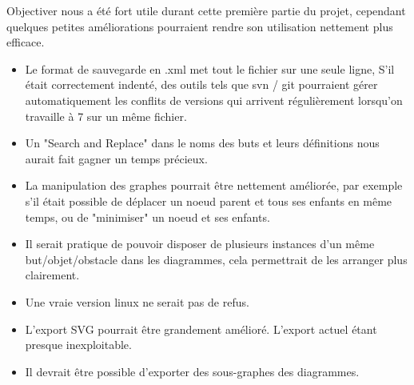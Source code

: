 Objectiver nous a été fort utile durant cette première partie du projet,
cependant quelques petites améliorations pourraient rendre son utilisation
nettement plus efficace.

\begin{itemize}
	\item Le format de sauvegarde en .xml met tout le fichier sur une seule
	ligne, S'il était correctement indenté, des outils tels que svn / git
	pourraient gérer automatiquement les conflits de versions qui arrivent
	régulièrement lorsqu'on travaille à 7 sur un même fichier.
	
	\item Un "Search and Replace" dans le noms des buts et leurs définitions
	nous aurait fait gagner un temps précieux. 

	\item La manipulation des graphes pourrait être nettement améliorée,
	par exemple s'il était possible de déplacer un noeud parent et tous ses
	enfants en même temps, ou de "minimiser" un noeud et ses enfants. 

	\item Il serait pratique de pouvoir disposer de plusieurs instances d'un
	même but/objet/obstacle dans les diagrammes, cela permettrait de les 
	arranger plus clairement.

	\item Une vraie version linux ne serait pas de refus.
	
	\item L'export SVG pourrait être grandement amélioré. L'export actuel
	étant presque inexploitable.
	
	\item Il devrait être possible d'exporter des sous-graphes des diagrammes.
\end{itemize}
